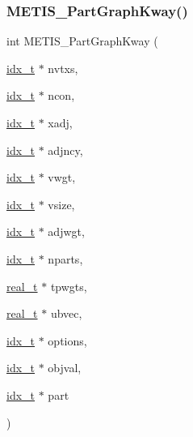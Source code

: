 \subsubsection{\texorpdfstring{M\+E\+T\+I\+S\+\_\+\+Part\+Graph\+Kway()}{METIS\_PartGraphKway()}}
{\footnotesize\ttfamily int M\+E\+T\+I\+S\+\_\+\+Part\+Graph\+Kway (\begin{DoxyParamCaption}\item[{\hyperlink{a00876_aaa5262be3e700770163401acb0150f52}{idx\+\_\+t} $\ast$}]{nvtxs,  }\item[{\hyperlink{a00876_aaa5262be3e700770163401acb0150f52}{idx\+\_\+t} $\ast$}]{ncon,  }\item[{\hyperlink{a00876_aaa5262be3e700770163401acb0150f52}{idx\+\_\+t} $\ast$}]{xadj,  }\item[{\hyperlink{a00876_aaa5262be3e700770163401acb0150f52}{idx\+\_\+t} $\ast$}]{adjncy,  }\item[{\hyperlink{a00876_aaa5262be3e700770163401acb0150f52}{idx\+\_\+t} $\ast$}]{vwgt,  }\item[{\hyperlink{a00876_aaa5262be3e700770163401acb0150f52}{idx\+\_\+t} $\ast$}]{vsize,  }\item[{\hyperlink{a00876_aaa5262be3e700770163401acb0150f52}{idx\+\_\+t} $\ast$}]{adjwgt,  }\item[{\hyperlink{a00876_aaa5262be3e700770163401acb0150f52}{idx\+\_\+t} $\ast$}]{nparts,  }\item[{\hyperlink{a00876_a1924a4f6907cc3833213aba1f07fcbe9}{real\+\_\+t} $\ast$}]{tpwgts,  }\item[{\hyperlink{a00876_a1924a4f6907cc3833213aba1f07fcbe9}{real\+\_\+t} $\ast$}]{ubvec,  }\item[{\hyperlink{a00876_aaa5262be3e700770163401acb0150f52}{idx\+\_\+t} $\ast$}]{options,  }\item[{\hyperlink{a00876_aaa5262be3e700770163401acb0150f52}{idx\+\_\+t} $\ast$}]{objval,  }\item[{\hyperlink{a00876_aaa5262be3e700770163401acb0150f52}{idx\+\_\+t} $\ast$}]{part }\end{DoxyParamCaption})}

